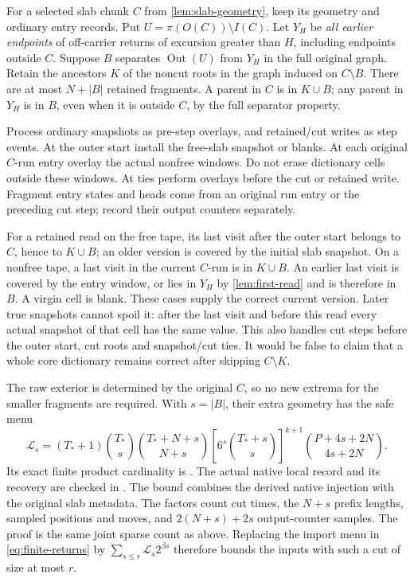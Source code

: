 For a selected slab chunk $C$ from \cref{lem:slab-geometry}, keep its geometry
and ordinary entry records. Put $U=\pi(O(C))\setminus I(C)$. Let $Y_H$ be
\emph{all earlier endpoints} of off-carrier returns of excursion greater
than $H$, including endpoints outside $C$. Suppose $B$ separates
$\operatorname{Out}(U)$ from $Y_H$ in the full original graph. Retain the
ancestors $K$ of the noncut roots in the graph induced on $C\setminus B$.
There are at most $N+|B|$ retained fragments. A parent in $C$ is in $K\cup B$;
any parent in $Y_H$ is in $B$, even when it is outside $C$, by the full
separator property.

Process ordinary snapshots as pre-step overlays, and retained/cut writes as
step events. At the outer start install the free-slab snapshot or blanks. At
each original $C$-run entry overlay the actual nonfree windows. Do not erase
dictionary cells outside these windows. At ties perform overlays before the
cut or retained write. Fragment entry states and heads come from an original
run entry or the preceding cut step; record their output counters separately.

For a retained read on the free tape, its last visit after the outer start
belongs to $C$, hence to $K\cup B$; an older version is covered by the initial
slab snapshot. On a nonfree tape, a last visit in the current $C$-run is in
$K\cup B$. An earlier last visit is covered by the entry window, or lies in
$Y_H$ by \cref{lem:first-read} and is therefore in $B$. A virgin cell is
blank. These cases supply the correct current version. Later true snapshots
cannot spoil it: after the last visit and before this read every actual
snapshot of that cell has the same value. This also handles cut steps before
the outer start, cut roots and snapshot/cut ties. It would be false to claim
that a whole core dictionary remains correct after skipping $C\setminus K$.

The raw exterior is determined by the original $C$, so no new extrema for
the smaller fragments are required. With $s=|B|$, their extra geometry has
the safe menu
\begin{equation}\label{eq:local-menu}
 \mathcal L_s=(T_*+1)\binom{T_*}{s}\binom{T_*+N+s}{N+s}
 \left[6^s\binom{T_*+s}{s}\right]^{k+1}
 \binom{P+4s+2N}{4s+2N}.
\end{equation}
Its exact finite product cardinality is
. The actual native local record and its
recovery are checked in .
The bound  combines the derived native
injection with the original slab metadata.
The factors count cut times, the $N+s$ prefix lengths, sampled positions and
moves, and $2(N+s)+2s$ output-counter samples. The proof is the same joint
sparse count as above. Replacing the import menu in \cref{eq:finite-returns}
by $\sum_{s\le r}\mathcal L_s2^{\beta s}$ therefore bounds the inputs with
such a cut of size at most $r$.

